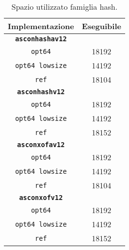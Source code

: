 \begin{table}[h]
    \caption{Spazio utilizzato famiglia hash.}
    \centering
    \begin{tabular}{|c|c|}
        \hline
        \textbf{Implementazione} & \textbf{Eseguibile} \\
        \hline
        \texttt{\textbf{asconhashav12}} & \\
        \hline
        \texttt{opt64} & 18192 \\
        \hline
        \texttt{opt64 lowsize} & 14192 \\
        \hline
        \texttt{ref} & 18104 \\
        \hline
        \texttt{\textbf{asconhashv12}} & \\
        \hline
        \texttt{opt64} & 18192 \\
        \hline
        \texttt{opt64 lowsize} & 14192 \\
        \hline
        \texttt{ref} & 18152 \\
        \hline
        \texttt{\textbf{asconxofav12}} & \\
        \hline
        \texttt{opt64} & 18192 \\
        \hline
        \texttt{opt64 lowsize} & 14192 \\
        \hline
        \texttt{ref} & 18104 \\
        \hline
        \texttt{\textbf{asconxofv12}} & \\
        \hline
        \texttt{opt64} & 18192 \\
        \hline
        \texttt{opt64 lowsize} & 14192 \\
        \hline
        \texttt{ref} & 18152 \\
        \hline
    \end{tabular}
\end{table}

